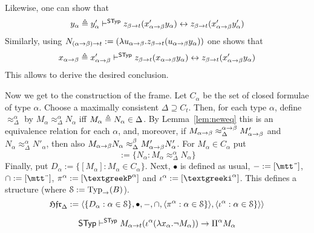 Likewise, one can show that
\begin{equation}
y_{\alpha} \triangleq y'_{\alpha} \vdash^{\mathsf{STyp}}
    z_{\beta\rightarrow t}(x'_{\alpha\rightarrow\beta}y_{\alpha}) \leftrightarrow
    z_{\beta\rightarrow t}(x'_{\alpha\rightarrow\beta}y'_{\alpha})
\end{equation}
Similarly, using $N_{(\alpha\rightarrow\beta) \rightarrow t} := (\lambda
u_{\alpha\rightarrow\beta}.z_{\beta\rightarrow t}(u_{\alpha\rightarrow \beta}
    y_{\alpha}))$ one shows that
\begin{equation}
x_{\alpha\rightarrow\beta} \triangleq x'_{\alpha\rightarrow\beta} \vdash^{\mathsf{STyp}}
    z_{\beta\rightarrow t}(x_{\alpha\rightarrow\beta}y_{\alpha}) \leftrightarrow
    z_{\beta\rightarrow t}(x'_{\alpha\rightarrow\beta}y_{\alpha}) 
\end{equation}
This allows to derive the desired conclusion. %
\proofend

Now we get to the construction of the frame. Let $C_{\alpha}$ be
the set of closed formulae of type $\alpha$. Choose a maximally
consistent $\Delta \supseteq C_t$. Then, for each type
$\alpha$, define $\approx^{\alpha}_{\Delta}$ by $M_{\alpha}
\approx^{\alpha}_{\Delta} N_{\alpha}$ iff $M_{\alpha}
\triangleq N_{\alpha} \in \Delta$. By Lemma~\ref{lem:neweq} this
is an equivalence relation for each $\alpha$, and, moreover, if
$M_{\alpha\rightarrow\beta} \approx^{\alpha\rightarrow\beta}_{\Delta}
M'_{\alpha\rightarrow\beta}$ and $N_{\alpha} \approx^{\alpha}_{\Delta}
N'_{\alpha}$, then also $M_{\alpha\rightarrow\beta}N_{\alpha}
\approx^{\beta}_{\Delta} M'_{\alpha\rightarrow\beta}N'_{\alpha}$. For
$M_{\alpha} \in C_{\alpha}$ put
\begin{equation}
[M_{\alpha}] := \{N_{\alpha} : M_{\alpha} \approx^{\alpha}_{\Delta}
N_{\alpha}\}
\end{equation}
Finally, put $D_{\alpha} := \{[M_{\alpha}] : M_{\alpha} \in
C_{\alpha}\}$. Next, $\bullet$ is defined as usual, $- :=
[\mbox{\mtt\symbol{5}}]$, $\cap := [\mbox{\mtt\symbol{4}}]$, 
$\pi^{\alpha} := [\GPi^{\alpha}]$ and 
$\iota^{\alpha} := [\Giota^{\alpha}]$. This 
defines a structure (where $\mathcal{S} := \operatorname{Typ}_{\rightarrow}(B)$).
\begin{equation}
\mathfrak{Hfr}_{\Delta} := \langle \{D_{\alpha}:
\alpha \in \mathcal{S}\}, \bullet, -, \cap, \langle
\pi^{\alpha} : \alpha \in \mathcal{S}\}\rangle, \langle
\iota^{\alpha} : \alpha \in \mathcal{S}\}\rangle\rangle
\end{equation}
\begin{lem}
\begin{equation*}
\mathsf{STyp} \vdash^{\mathsf{STyp}} M_{\alpha\rightarrow t}(\iota^{\alpha}(\lambda
x_{\alpha}.\neg M_{\alpha})) \rightarrow \Pi^{\alpha}M_{\alpha}
\end{equation*}
\end{lem}
